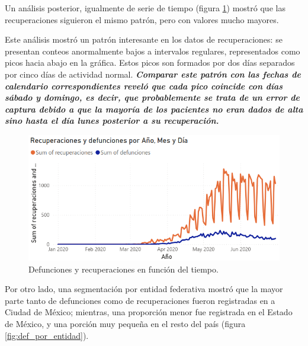 \documentclass[a4paper,12pt]{article}
\begin{document}
Un análisis posterior, igualmente de serie de tiempo (figura \ref{fig:def_rec_por_tiempo}) mostró que las recuperaciones siguieron el mismo patrón, pero con valores mucho mayores.

Este análisis mostró un patrón interesante en los datos de recuperaciones: se presentan conteos anormalmente bajos a intervalos regulares, representados como picos hacia abajo en la gráfica.
Estos picos son formados por dos días separados por cinco días de actividad normal.
{\slshape {\bfseries Comparar este patrón con las fechas de calendario correspondientes reveló que cada pico coincide con días sábado y domingo, es decir, que probablemente se trata de un error de captura debido a que la mayoría de los pacientes no eran dados de alta sino hasta el día lunes posterior a su recuperación.}}

\begin{figure}[!ht]
    \begin{center}
	\includegraphics[scale=0.6]{Def_rec_por_tiempo.png}
    \end{center}
    \captionsetup{width=\linewidth}
    \caption{Defunciones y recuperaciones en función del tiempo.}
    \label{fig:def_rec_por_tiempo}
\end{figure}

Por otro lado, una segmentación por entidad federativa mostró que la mayor parte tanto de defunciones como de recuperaciones fueron registradas en a Ciudad de México; mientras, una proporción menor fue registrada en el Estado de México, y una porción muy pequeña en el resto del país (figura \ref{fig:def_por_entidad}).
\end{document}
